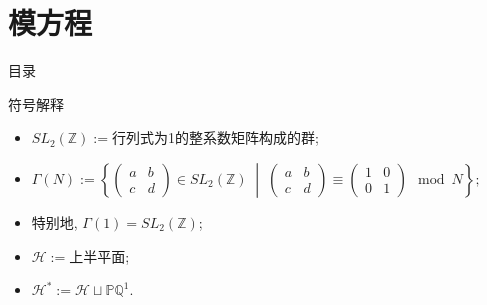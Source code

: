 \documentclass[pdf]{beamer}
\numberwithin{equation}{section}
\theoremstyle{plain}
\theoremstyle{plain}
\theoremstyle{remark}
\begin{document}
\section{模方程}
\begin{frame}{目录}
\end{frame}

	\begin{frame}[fragile]{符号解释}
	\begin{itemize}
		\item $SL_2(\mathbb{Z}):=$行列式为1的整系数矩阵构成的群;
		\item $\displaystyle\Gamma(N):=\left\{ \begin{pmatrix}
		a &b \\ c & d
		\end{pmatrix} \in SL_2(\mathbb{Z}) \;\middle|\; \begin{pmatrix}
		a &b \\ c & d
		\end{pmatrix} \equiv \begin{pmatrix}
		1 &0 \\ 0 & 1
		\end{pmatrix} \mod N  \right\};$
		\item 特别地, $\Gamma(1)=SL_2(\mathbb{Z})$;
		\item $\mathcal{H}:=$上半平面;
		\item $\mathcal{H}^*:=\mathcal{H} \sqcup \mathbb{PQ}^1$.
	\end{itemize}



\end{frame}
\end{document}
